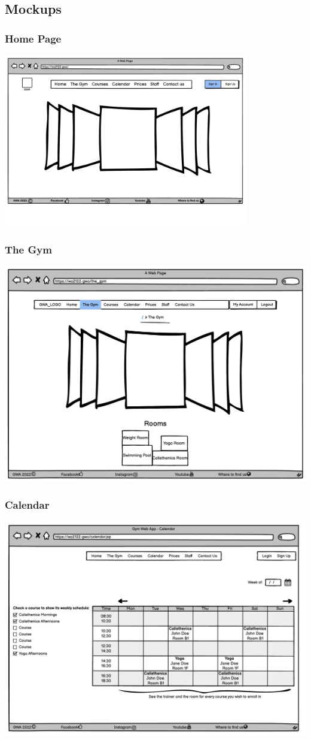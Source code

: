 \newpage
\subsection{Mockups}

\subsubsection{Home Page}
\includegraphics[width=0.8\textwidth]{InterfaceMockup/Index.pdf}

\subsubsection{The Gym}
\includegraphics[width=0.8\columnwidth]{InterfaceMockup/TheGym/TheGym_desktopVersion.pdf}

\subsubsection{Calendar}
\includegraphics[width=0.8\columnwidth]{InterfaceMockup/Calendar.pdf}

